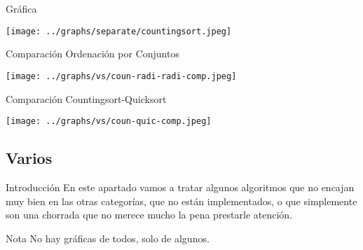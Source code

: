 \documentclass[compress]{beamer}
\begin{document}
\begin{frame}{Gráfica}
	\begin{alertblock}{}
		\begin{center}
		\texttt{[image: ../graphs/separate/countingsort.jpeg]}
		\end{center}
	\end{alertblock}
\end{frame}

\begin{frame}{Comparación Ordenación por Conjuntos}
	\begin{alertblock}{}
		\begin{center}
		\texttt{[image: ../graphs/vs/coun-radi-radi-comp.jpeg]}
		\end{center}
	\end{alertblock}
\end{frame}

\begin{frame}{Comparación Countingsort-Quicksort}
	\begin{alertblock}{}
		\begin{center}
		\texttt{[image: ../graphs/vs/coun-quic-comp.jpeg]}
		\end{center}
	\end{alertblock}
\end{frame}

\subsection{Varios}

\begin{frame}{Introducción}
En este apartado vamos a tratar algunos algoritmos que no encajan muy bien en las otras categorías, que no están implementados, o que simplemente son una chorrada que no merece mucho la pena prestarle atención.\\
\vspace{0.20in}
	\begin{exampleblock}{Nota}
	No hay gráficas de todos, solo de algunos.
	\end{exampleblock}
\end{frame}
\end{document}
